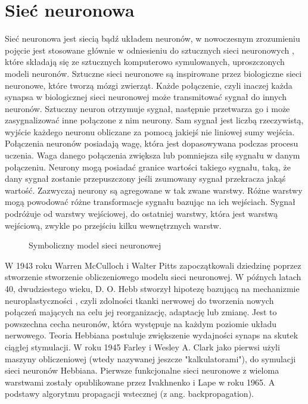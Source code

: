 \section{Sieć neuronowa}

Sieć neuronowa \cite{NeuralNetwork} \cite{ArtificialNeuralNetwork} \cite{DeepLearningFromScratch} \cite{HandsOnMachineLearning} jest siecią bądź układem neuronów, w nowoczesnym zrozumieniu pojęcie jest stosowane głównie w odniesieniu do sztucznych sieci neuronowych , które składają się ze sztucznych komputerowo symulowanych, uproszczonych modeli neuronów. Sztuczne sieci neuronowe są inspirowane przez biologiczne sieci neuronowe, które tworzą mózgi zwierząt.
Każde połączenie, czyli inaczej każda synapsa w biologicznej sieci neuronowej może transmitować sygnał do innych neuronów. Sztuczny neuron otrzymuje sygnał, następnie przetwarza go i może zasygnalizować inne połączone z nim neurony. Sam sygnał jest liczbą rzeczywistą, wyjście każdego neuronu obliczane za pomocą jakiejś nie liniowej sumy wejścia. Połączenia neuronów posiadają wagę, która jest dopasowywana podczas procesu uczenia. Waga danego połączenia zwiększa lub pomniejsza siłę sygnału w danym połączeniu. Neurony mogą posiadać granice wartości takiego sygnału, taką, że dany sygnał zostanie przepuszczony jeśli zsumowany sygnał przekracza jakąś wartość. Zazwyczaj neurony są agregowane w tak zwane warstwy. Różne warstwy mogą powodować różne transformacje sygnału bazując na ich wejściach. Sygnał podróżuje od warstwy wejściowej, do ostatniej warstwy, która jest warstwą wejściową, zwykle po przejściu kilku wewnętrznych warstw.


\begin{figure}[h]
    \centering
    \caption{Symboliczny model sieci neuronowej \cite{ColoredNeuralNetwork}}
    \label{img:nn_symbolic_diagram}
\end{figure}


\clearpage


W 1943 roku Warren McCulloch i Walter Pitts zapoczątkowali dziedzinę poprzez stworzenie stworzenie obliczeniowego modelu sieci neuronowej. W późnych latach 40, dwudziestego wieku, D. O. Hebb stworzył hipotezę bazującą na mechanizmie neuroplastyczności \cite{Neuroplastycznosc}, czyli zdolności tkanki nerwowej do tworzenia nowych połączeń mających na celu jej reorganizację, adaptację lub zmianę. Jest to powszechna cecha neuronów, która występuje na każdym poziomie układu nerwowego. Teoria Hebbiana postuluje zwiększenie wydajności synaps na skutek ciągłej stymulacji. W roku 1945 Farley i Wesley A. Clark jako pierwsi użyli maszyny obliczeniowej (wtedy nazywanej jeszcze "kalkulatorami"), do symulacji sieci neuronów Hebbiana. Pierwsze funkcjonalne sieci neuronowe z wieloma warstwami zostały opublikowane przez Ivakhnenko i Lape w roku 1965. A podstawy algorytmu propagacji wstecznej (z ang. backpropagation).

